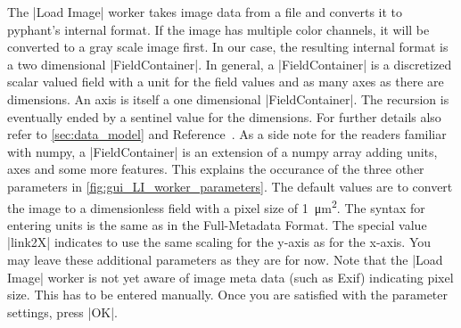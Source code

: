 \documentclass[a4paper]{article}
\begin{document}
The |Load Image| worker takes image data from a file and converts it
to pyphant's internal format. If the image has multiple color
channels, it will be converted to a gray scale image first. In our
case, the resulting internal format is a two dimensional
|FieldContainer|. In general, a |FieldContainer| is a discretized
scalar valued field with a unit for the field values and as many axes
as there are dimensions. An axis is itself a one dimensional
|FieldContainer|. The recursion is eventually ended by a sentinel
value for the dimensions. For further details also refer to
\autoref{sec:data_model} and Reference~\cite{pyphant}. As a side note
for the readers familiar with numpy\cite{numpy}, a |FieldContainer| is
an extension of a numpy array adding units, axes and some more
features. This explains the occurance of the three other parameters in
\autoref{fig:gui_LI_worker_parameters}. The default values are to
convert the image to a dimensionless field with a pixel size of
\SI{1}{\micro\metre\squared}. The syntax for entering units is the
same as in the Full-Metadata Format\cite{Riede2010651}. The special
value |link2X| indicates to use the same scaling for the y-axis as for
the x-axis. You may leave these additional parameters as they are for
now. Note that the |Load Image| worker is not yet aware of image meta
data (such as Exif) indicating pixel size. This has to be entered
manually. Once you are satisfied with the parameter settings, press
|OK|.
\end{document}
